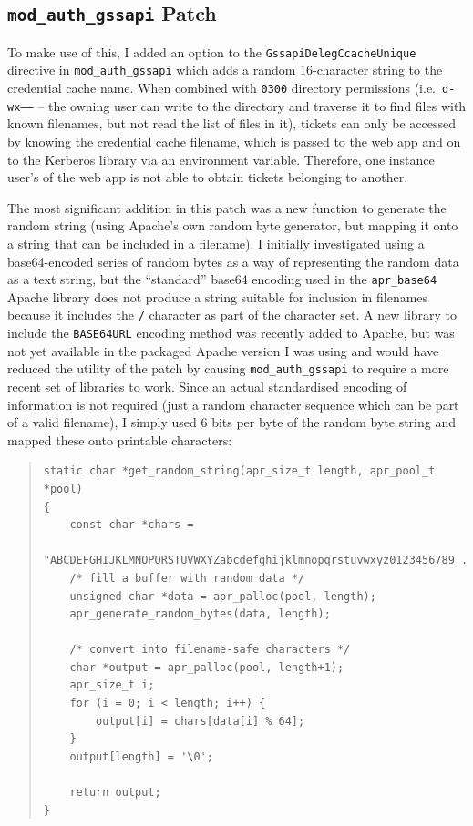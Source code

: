 \documentclass[12pt]{report}
\begin{document}
\subsection{\texttt{mod\_auth\_gssapi} Patch}
To make use of this, I added an option to the \texttt{GssapiDelegCcacheUnique} directive in \verb+mod_auth_gssapi+ which adds a random 16-character string to the credential cache name. When combined with \texttt{0300} directory permissions (i.e.\ \texttt{d-wx------} -- the owning user can write to the directory and traverse it to find files with known filenames, but not read the list of files in it), tickets can only be accessed by knowing the credential cache filename, which is passed to the web app and on to the Kerberos library via an environment variable. Therefore, one instance user's of the web app is not able to obtain tickets belonging to another.

The most significant addition in this patch was a new function to generate the random string (using Apache's own random byte generator, but mapping it onto a string that can be included in a filename). I initially investigated using a base64-encoded series of random bytes as a way of representing the random data as a text string, but the ``standard'' base64 encoding used in the \verb+apr_base64+ Apache library does not produce a string suitable for inclusion in filenames because it includes the \verb+/+ character as part of the character set\cite{RFC4648}. A new library to include the \texttt{BASE64URL} encoding method was recently added to Apache\cite{Apache-base64-commit}, but was not yet available in the packaged Apache version I was using and would have reduced the utility of the patch by causing \verb+mod_auth_gssapi+ to require a more recent set of libraries to work. Since an actual standardised encoding of information is not required (just a random character sequence which can be part of a valid filename), I simply used 6 bits per byte of the random byte string and mapped these onto printable characters:


\begin{quote}
\begin{samepage}
\begin{verbatim}
static char *get_random_string(apr_size_t length, apr_pool_t *pool)
{
    const char *chars =
     "ABCDEFGHIJKLMNOPQRSTUVWXYZabcdefghijklmnopqrstuvwxyz0123456789_.";
    /* fill a buffer with random data */
    unsigned char *data = apr_palloc(pool, length);
    apr_generate_random_bytes(data, length);

    /* convert into filename-safe characters */
    char *output = apr_palloc(pool, length+1);
    apr_size_t i;
    for (i = 0; i < length; i++) {
        output[i] = chars[data[i] % 64];
    }
    output[length] = '\0';

    return output;
}
\end{verbatim}
\end{samepage}
\end{quote}
\end{document}
